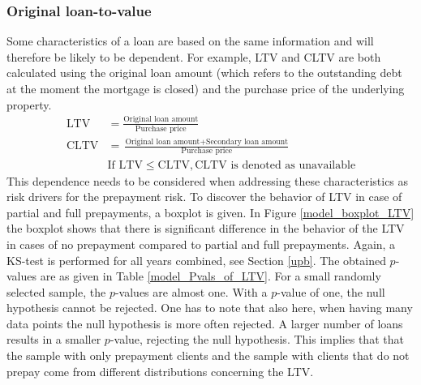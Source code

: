     \subsubsection{Original loan-to-value}\label{orig_ltv}
        Some characteristics of a loan are based on the same information
        and will therefore be likely to be dependent. 
        For example, LTV and CLTV 
        are both calculated using the original loan amount
        (which refers to the outstanding debt at the moment the 
        mortgage is closed) and the purchase price of the
        underlying property. 
        \begin{align}
            \text{LTV}&=
            \frac{\text{Original loan amount}}{\text{Purchase price}}\\
            \text{CLTV}&=
            \frac{\text{Original loan amount}+\text{Secondary loan amount}}{\text{Purchase price}}\\
            &\text{If } \text{LTV} \leq \text{CLTV}, \text{CLTV} \text{ is denoted as unavailable}
        \end{align}
        This dependence needs to be considered when addressing these 
        characteristics as risk drivers for the prepayment risk. 
        To discover the behavior of LTV in case of partial and full
        prepayments, a boxplot is given. In Figure 
        \ref{model_boxplot_LTV} the boxplot shows that there is 
        significant difference in the behavior of the LTV in cases of 
        no prepayment compared to partial and full prepayments.
        Again, a KS-test is performed for all years combined, see
        Section \ref{upb}. The obtained $p$-values are as given in
        Table \ref{model_Pvals_of_LTV}. For a small randomly
        selected sample, the $p$-values are almost one. With a
        $p$-value of one, the null hypothesis cannot be rejected. One has to note that also here, when having many data points the null hypothesis is more often rejected. A
        larger number of loans results in a smaller $p$-value,
        rejecting the null hypothesis. This implies that that the
        sample with only prepayment clients and the sample 
        with clients that do not prepay come from different distributions concerning the LTV. 
